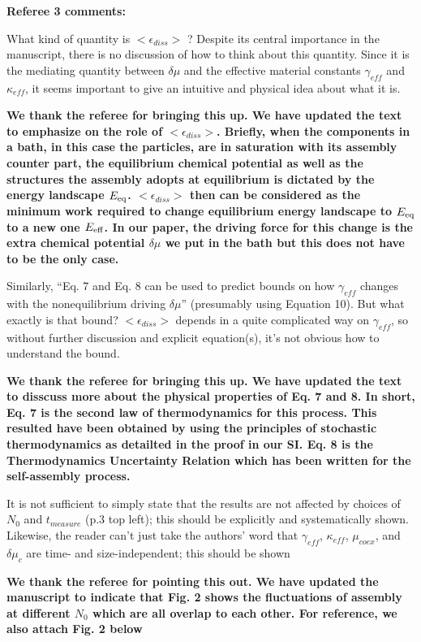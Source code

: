 \documentclass{letter}
\begin{document}
\begin{letter}{}
{\bf Referee 3 comments:}

 What kind of quantity is $<\epsilon_{diss}>$ ? Despite its central 
importance in the manuscript, there is no discussion of how to think 
about this quantity. Since it is the mediating quantity between $\delta 
\mu$ and the effective material constants $\gamma_{eff}$ and 
$\kappa_{eff}$, it seems important to give an intuitive and physical 
idea about what it is. 

{\bf We thank the referee for bringing this up. We have updated the text to emphasize on the role of $<\epsilon_{diss}>$. Briefly, when the components in a bath, in this case the particles, are in saturation with its assembly counter part, the equilibrium chemical potential as well as the structures the assembly adopts at equilibrium is dictated by the energy landscape $E_{\rm eq}$. $<\epsilon_{diss}>$ then can be considered as the minimum work required to change equilibrium energy landscape to $E_{\rm eq}$ to a new one $E_{\rm eff}$. In our paper, the driving force for this change is the extra chemical potential $\delta\mu$ we put in the bath but this does not have to be the only case.}

Similarly, “Eq. 7 and Eq. 8 can be used to predict bounds on how 
$\gamma_{eff}$ changes with the nonequilibrium driving $\delta \mu$” 
(presumably using Equation 10). But what exactly is that bound? 
$<\epsilon_{diss}>$ depends in a quite complicated way on $\gamma_{eff}$, so without further discussion and explicit equation(s), it’s not 
obvious how to understand the bound. 

{\bf We thank the referee for bringing this up. We have updated the text to disscuss more about the physical properties of Eq. 7 and 8. In short, Eq. 7 is the second law of thermodynamics for this process. This resulted have been obtained by using the principles of stochastic thermodynamics as detailted in the proof in our SI. Eq. 8 is the Thermodynamics Uncertainty Relation which has been written for the self-assembly process.}

It is not sufficient to simply state that the results are not affected 
by choices of $N_0$ and $t_{measure}$ (p.3 top left); this should be 
explicitly and systematically shown. Likewise, the reader can’t just 
take the authors’ word that $\gamma_{eff}$, $\kappa_{eff}$, $\mu_{coex}$, 
and $\delta \mu_c$ are time- and size-independent; this should be shown

{\bf We thank the referee for pointing this out. We have updated the manuscript to indicate that Fig. 2 shows the fluctuations of assembly at different $N_0$ which are all overlap to each other. For reference, we also attach Fig. 2 below }


\end{letter}
\end{document}
